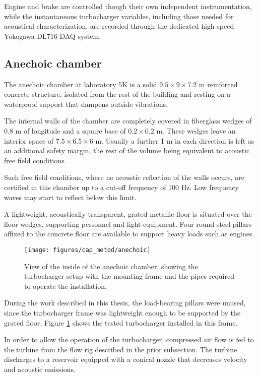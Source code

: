 Engine and brake are controlled though their own independent instrumentation, while the instantaneous turbocharger variables, including those needed for acoustical characterization, are recorded through the dedicated high speed Yokogawa DL716 DAQ system.

\subsection{Anechoic chamber} \label{sub:anec_chamber}

The anechoic chamber at laboratory 5K is a solid $9.5 \times 9 \times 7.2$ m reinforced concrete structure, isolated from the rest of the building and resting on a waterproof support that dampens outside vibrations.

The internal walls of the chamber are completely covered in fiberglass wedges of 0.8 m of longitude and a square base of $0.2 \times 0.2$ m. These wedges leave an interior space of $7.5 \times 6.5 \times 6$ m. Usually a further 1 m in each direction is left as an additional safety margin, the rest of the volume being equivalent to acoustic free field conditions.

Such free field conditions, where no acoustic reflection of the walls occurs, are certified in this chamber up to a cut-off frequency of 100 Hz. Low frequency waves may start to reflect below this limit.

A lightweight, acoustically-transparent, grated metallic floor is situated over the floor wedges, supporting personnel and light equipment. Four round steel pillars affixed to the concrete floor are available to support heavy loads such as engines.

\begin{figure}[t!]
\centering
\texttt{[image: figures/cap\_metod/anechoic]}
\caption{View of the inside of the anechoic chamber, showing the turbocharger setup with the mounting frame and the pipes required to operate the installation.}
\label{fig:anechoic_chamber}
\end{figure}

During the work described in this thesis, the load-bearing pillars were unused, since the turbocharger frame was lightweight enough to be supported by the grated floor. Figure \ref{fig:anechoic_chamber} shows the tested turbocharger installed in this frame.

In order to allow the operation of the turbocharger, compressed air flow is fed to the turbine from the flow rig described in the prior subsection. The turbine discharges to a reservoir equipped with a conical nozzle that decreases velocity and acoustic emissions.

